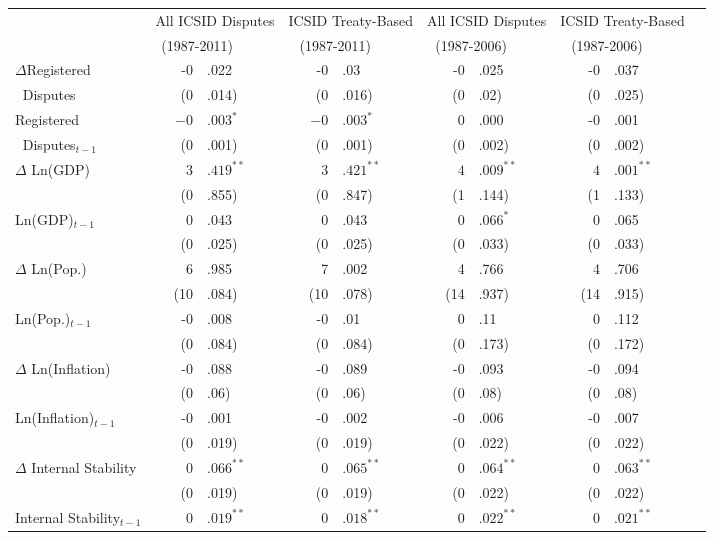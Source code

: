 \begin{table}[ht]
\centering
{\footnotesize
\begin{tabular}{lr@{} lr@{}lr@{}lr@{}lr@{}}
  \hline\hline
  ~ & \multicolumn{2}{c}{All ICSID Disputes} & \multicolumn{2}{c}{ICSID Treaty-Based}  & \multicolumn{2}{c}{All ICSID Disputes} & \multicolumn{2}{c}{ICSID Treaty-Based} \\
  ~ & \multicolumn{2}{c}{(1987-2011) $\;\;\;\;\;\;\;\;$} & \multicolumn{2}{c}{(1987-2011)$\;\;\;\;\;\;\;\;$} & \multicolumn{2}{c}{(1987-2006)$\;\;\;\;\;\;\;\;$} &  \multicolumn{2}{c}{(1987-2006)$\;\;\;\;\;\;\;\;$}  \\
  \hline
$\Delta$Registered & -0&.022 & -0&.03 & -0&.025 & -0&.037 \\ 
$\;\;$Disputes   & (0&.014) & (0&.016) & (0&.02) & (0&.025) \\ 
  Registered & $-0$&$.003^{\ast}$ & $-0$&$.003^{\ast}$ & 0&.000 & -0&.001 \\ 
$\;\;$Disputes$_{t-1}$   & (0&.001) & (0&.001) & (0&.002) & (0&.002) \\ 
  $\Delta$ Ln(GDP) & $3$&$.419^{\ast\ast}$ & $3$&$.421^{\ast\ast}$ & $4$&$.009^{\ast\ast}$ & $4$&$.001^{\ast\ast}$ \\ 
   & (0&.855) & (0&.847) & (1&.144) & (1&.133) \\ 
  Ln(GDP)$_{t-1}$ & 0&.043 & 0&.043 & $0$&$.066^{\ast}$ & 0&.065 \\ 
   & (0&.025) & (0&.025) & (0&.033) & (0&.033) \\ 
  $\Delta$ Ln(Pop.) & 6&.985 & 7&.002 & 4&.766 & 4&.706 \\ 
   & (10&.084) & (10&.078) & (14&.937) & (14&.915) \\ 
  Ln(Pop.)$_{t-1}$ & -0&.008 & -0&.01 & 0&.11 & 0&.112 \\ 
   & (0&.084) & (0&.084) & (0&.173) & (0&.172) \\ 
  $\Delta$ Ln(Inflation) & -0&.088 & -0&.089 & -0&.093 & -0&.094 \\ 
   & (0&.06) & (0&.06) & (0&.08) & (0&.08) \\ 
  Ln(Inflation)$_{t-1}$ & -0&.001 & -0&.002 & -0&.006 & -0&.007 \\ 
   & (0&.019) & (0&.019) & (0&.022) & (0&.022) \\ 
  $\Delta$ Internal Stability & $0$&$.066^{\ast\ast}$ & $0$&$.065^{\ast\ast}$ & $0$&$.064^{\ast\ast}$ & $0$&$.063^{\ast\ast}$ \\ 
   & (0&.019) & (0&.019) & (0&.022) & (0&.022) \\ 
  Internal Stability$_{t-1}$ & $0$&$.019^{\ast\ast}$ & $0$&$.018^{\ast\ast}$ & $0$&$.022^{\ast\ast}$ & $0$&$.021^{\ast\ast}$ \\ 

\end{tabular}}
\end{table}

